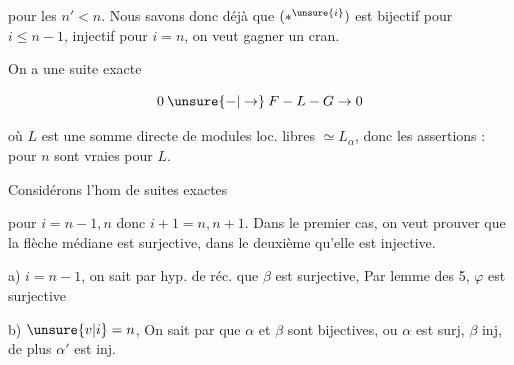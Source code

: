 pour les $n'<n$.  Nous savons donc déjà que \deleted{\unsure{$\ast$}}$(\ast^{\unsure{i}})$ est bijectif pour $i\leq n-1$, injectif pour $i=n$, on veut gagner un cran.

On a une suite exacte

\[
0\mathbin{\unsure{-|\to}}F\mathbin{-}L\mathbin{-}G\to0
\]

où  $L$ est une somme directe de modules loc. libres  $\simeq L_\alpha$, donc les assertions : pour $n$ sont vraies pour $L$.

Considérons l'hom de suites exactes


pour $i=n-1,n$ donc $i+1=n,n+1$. Dans le premier cas, on veut prouver que la flèche médiane est surjective, dans le deuxième qu'elle est injective.

a) $i=n-1$, on sait par hyp. de réc. que $\beta$ est surjective,    Par lemme des 5, $\varphi$ est  surjective 

b) $\unsure{v|i}=n$, On sait par     que $\alpha$ et $\beta$ sont bijectives, ou $\alpha$ est surj, $\beta$ inj, de plus $\alpha'$ est inj.

